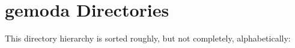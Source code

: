 \section{gemoda Directories}
This directory hierarchy is sorted roughly, but not completely, alphabetically:\begin{CompactList}
\item {}
\end{CompactList}
